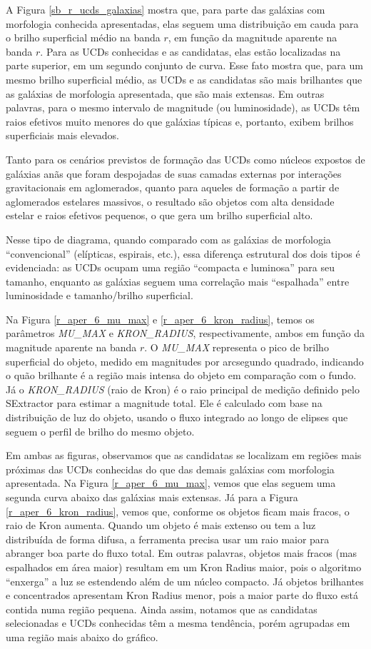A Figura \ref{sb_r_ucds_galaxias} mostra que, para parte das galáxias com morfologia conhecida apresentadas, elas seguem uma distribuição em cauda para o brilho superficial médio na banda $r$, em função da magnitude aparente na banda $r$. Para as UCDs conhecidas e as candidatas, elas estão localizadas na parte superior, em um segundo conjunto de curva. Esse fato mostra que, para um mesmo brilho superficial médio, as UCDs e as candidatas são mais brilhantes que as galáxias de morfologia apresentada, que são mais extensas. Em outras palavras, para o mesmo intervalo de magnitude (ou luminosidade), as UCDs têm raios efetivos muito menores do que galáxias típicas e, portanto, exibem brilhos superficiais mais elevados.

Tanto para os cenários previstos de formação das UCDs como núcleos expostos de galáxias anãs que foram despojadas de suas camadas externas por interações gravitacionais em aglomerados, quanto para aqueles de formação a partir de aglomerados estelares massivos, o resultado são objetos com alta densidade estelar e raios efetivos pequenos, o que gera um brilho superficial alto.

Nesse tipo de diagrama, quando comparado com as galáxias de morfologia “convencional” (elípticas, espirais, etc.), essa diferença estrutural dos dois tipos é evidenciada: as UCDs ocupam uma região “compacta e luminosa” para seu tamanho, enquanto as galáxias seguem uma correlação mais “espalhada” entre luminosidade e tamanho/brilho superficial.

Na Figura \ref{r_aper_6_mu_max} e \ref{r_aper_6_kron_radius}, temos os parâmetros \textit{MU\_MAX} e \textit{KRON\_RADIUS}, respectivamente, ambos em função da magnitude aparente na banda $r$. O \textit{MU\_MAX} representa o pico de brilho superficial do objeto, medido em magnitudes por arcsegundo quadrado, indicando o quão brilhante é a região mais intensa do objeto em comparação com o fundo. Já o \textit{KRON\_RADIUS} (raio de Kron) é o raio principal de medição definido pelo SExtractor para estimar a magnitude total. Ele é calculado com base na distribuição de luz do objeto, usando o fluxo integrado ao longo de elipses que seguem o perfil de brilho do mesmo objeto.

Em ambas as figuras, observamos que as candidatas se localizam em regiões mais próximas das UCDs conhecidas do que das demais galáxias com morfologia apresentada. Na Figura \ref{r_aper_6_mu_max}, vemos que elas seguem uma segunda curva abaixo das galáxias mais extensas. Já para a Figura \ref{r_aper_6_kron_radius}, vemos que, conforme os objetos ficam mais fracos, o raio de Kron aumenta. Quando um objeto é mais extenso ou tem a luz distribuída de forma difusa, a ferramenta precisa usar um raio maior para abranger boa parte do fluxo total. Em outras palavras, objetos mais fracos (mas espalhados em área maior) resultam em um Kron Radius maior, pois o algoritmo “enxerga” a luz se estendendo além de um núcleo compacto. Já objetos brilhantes e concentrados apresentam Kron Radius menor, pois a maior parte do fluxo está contida numa região pequena. Ainda assim, notamos que as candidatas selecionadas e UCDs conhecidas têm a mesma tendência, porém agrupadas em uma região mais abaixo do gráfico.

